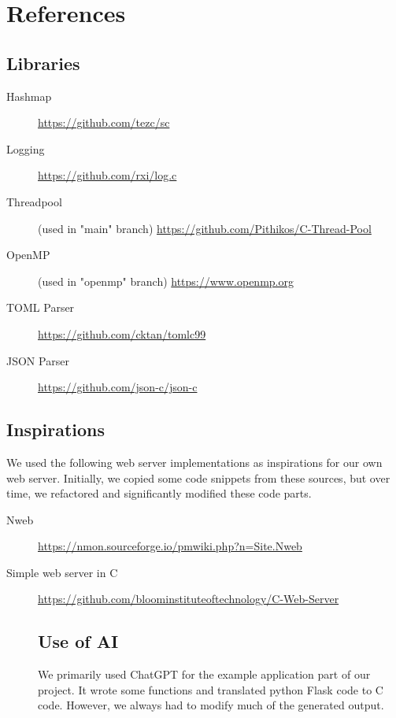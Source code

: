 \section*{References}

\subsection*{Libraries}
\begin{description}
    \item[Hashmap] \url{https://github.com/tezc/sc}
    \item[Logging] \url{https://github.com/rxi/log.c}
    \item[Threadpool] (used in "main" branch) \url{https://github.com/Pithikos/C-Thread-Pool}
    \item[OpenMP] (used in "openmp" branch) \url{https://www.openmp.org}
    \item[TOML Parser] \url{https://github.com/cktan/tomlc99}
    \item[JSON Parser] \url{https://github.com/json-c/json-c}
\end{description}

\subsection*{Inspirations}

We used the following web server implementations as inspirations for our own web server. Initially, we copied some code snippets from these sources, but over time, we refactored and significantly modified these code parts.

\begin{description}
    \item[Nweb] \url{https://nmon.sourceforge.io/pmwiki.php?n=Site.Nweb}
\item[Simple web server in C] \url{https://github.com/bloominstituteoftechnology/C-Web-Server}

\subsection*{Use of AI}
We primarily used ChatGPT for the example application part of our project. It wrote some functions and translated python Flask code to C code. However, we always had to modify much of the generated output.

\end{description}

